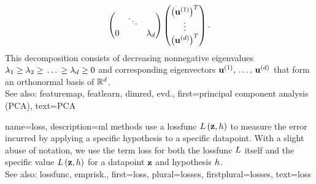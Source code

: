 {{$$\begin{pmatrix}
			& \ddots &   \\
			0                 &        & \lambda_{d}
			\end{pmatrix}
			\begin{pmatrix}
			\big(\mathbf{u}^{(1)}\big)^{T} \\
			\vdots                         \\
			\big(\mathbf{u}^{(d)}\big)^{T}
		\end{pmatrix}.$$
		This decomposition consists of decreasing nonnegative \glspl{eigenvalue} 
		$\lambda_{1} \geq \lambda_{2} \geq \,\ldots \,\geq \lambda_{d} 
		\geq 0$ and corresponding \glspl{eigenvector} $\mathbf{u}^{(1)},\,\ldots,\,\mathbf{u}^{(d)}$ 
		that form an orthonormal \gls{basis} of $\mathbb{R}^{d}$.
				 \\
		See also: \gls{featuremap}, \gls{featlearn}, \gls{dimred}, \gls{evd}.},
	first={principal component analysis (PCA)},
	text={PCA} 
}
	
{name={loss}, 
	description={\gls{ml} methods use a 
		\gls{lossfunc} $L\left({\bf z},h \right)$ to measure the error incurred 
		by applying a specific \gls{hypothesis} to a specific \gls{datapoint}. With a
		slight abuse of notation, we use the term loss for both the \gls{lossfunc} $L$ 
		itself and the specific value $L\left({\bf z},h \right)$ for a \gls{datapoint} ${\bf z}$ 
		and \gls{hypothesis} $h$.
				\\
		See also: \gls{lossfunc}, \gls{emprisk}.},
	first={loss},
	plural={losses},
	firstplural={losses},
	text={loss} 
}

